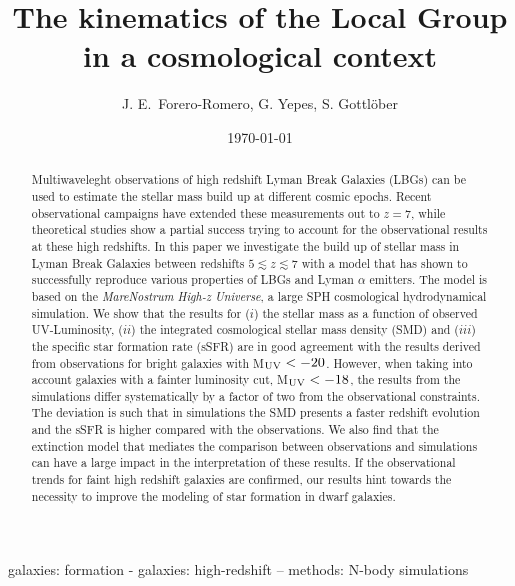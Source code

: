\documentclass{emulateapj}
\begin{document}
\title{The kinematics of the Local Group in a cosmological context}
\author{
J. E.\ Forero-Romero,
G. Yepes,
S. Gottl\"ober
}

\date{\today}

\begin{abstract}
Multiwaveleght observations of high redshift Lyman Break Galaxies
  (LBGs) can be used to estimate the stellar mass build up at
  different cosmic epochs. Recent observational campaigns have
  extended these measurements out to $z=7$, while theoretical studies 
  show a partial success trying to account for the observational
  results at these high redshifts.
  In this paper we investigate the build up of stellar mass in Lyman Break
  Galaxies between redshifts $5\lesssim z   \lesssim 7$  with a model
  that has shown to successfully reproduce various properties   of
  LBGs and Lyman $\alpha$ emitters.  The model is
  based on the {\em MareNostrum  High-z Universe}, a large SPH
  cosmological hydrodynamical simulation. We show that the results for
  ($i$) the stellar mass as a function of observed
  UV-Luminosity, ($ii$) the integrated cosmological stellar mass   density
  (SMD) and ($iii$) the specific star formation rate (sSFR) are in good
  agreement with the results derived from observations  for bright
  galaxies with M$_{\rm UV}<-20$.  However, when taking into account
  galaxies with a fainter luminosity cut, M$_{\rm UV}<-18$, the
  results from the simulations differ systematically by a factor of two from the  observational   constraints. The deviation is such that in simulations the SMD presents a faster  redshift evolution and the sSFR is higher compared with the observations.  We also find that the extinction model that mediates the comparison between observations and simulations can have a large impact in the interpretation of these results. If the observational trends for faint high redshift galaxies are confirmed, our results hint towards the   necessity to
  improve the modeling of star formation in dwarf galaxies. 
\end{abstract}

\begin{keywords}
{galaxies: formation - galaxies: high-redshift -- methods: N-body simulations}
\end{keywords}
\end{document}
